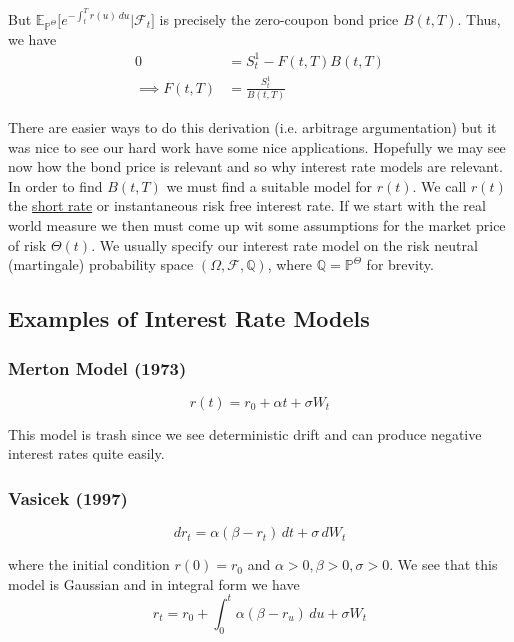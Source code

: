 \documentclass[12pt]{article}
\newlength\tindent
\renewcommand{\indent}{\hspace*{\tindent}}
\begin{document}
But $\mathbb E_{\mathbb P^\Theta}\bigg[e^{-\int^T_t r(u)\,du} \Big| \mathcal F_t\bigg]$ is precisely the zero-coupon bond price $B(t,T)$. Thus, we have
\begin{align*}
	0 &= S^1_t - F(t,T)B(t,T) \\
	\implies F(t,T) &= \frac{S^1_t}{B(t,T)}
\end{align*}

\indent There are easier ways to do this derivation (i.e. arbitrage argumentation) but it was nice to see our hard work have some nice applications. Hopefully we may see now how the bond price is relevant and so why interest rate models are relevant. \\

\indent In order to find $B(t,T)$ we must find a suitable model for $r(t)$. We call $r(t)$ the \underline{short rate} or instantaneous risk free interest rate. If we start with the real world measure we then must come up wit some assumptions for the market price of risk $\Theta(t)$. We usually specify our interest rate model on the risk neutral (martingale) probability space $(\Omega,\mathcal F,\mathbb Q)$, where $\mathbb Q = \mathbb P^\Theta$ for brevity.

\subsection{Examples of Interest Rate Models}

\subsubsection{Merton Model (1973)}
\begin{equation*}
	r(t) = r_0 + \alpha t + \sigma W_t
\end{equation*}

\indent This model is trash since we see deterministic drift and can produce negative interest rates quite easily.

\subsubsection{Vasicek (1997)}
\begin{equation*}
	dr_t = \alpha(\beta - r_t)\,dt + \sigma\,dW_t
\end{equation*}

where the initial condition $r(0) = r_0$ and $\alpha > 0, \beta > 0, \sigma > 0$. We see that this model is Gaussian and in integral form we have
\begin{equation*}
	r_t = r_0 + \int^t_0 \alpha(\beta - r_u)\,du + \sigma W_t
\end{equation*}
\end{document}
